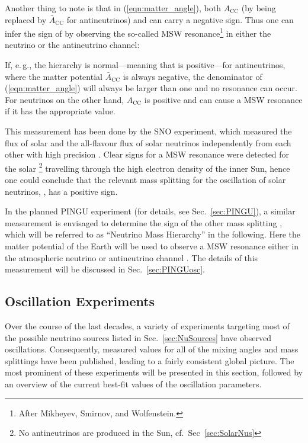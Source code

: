 Another thing to note is that in (\ref{eqn:matter_angle}), both $A_\mathrm{CC}$ 
(by being replaced by $\bar{A}_\mathrm{CC}$ for antineutrinos)
and \dm{} can carry a negative sign. Thus one can infer the sign of \dm{} by
observing the so-called MSW resonance\footnote{After Mikheyev, Smirnov, and
Wolfenstein.} in either the neutrino or the antineutrino channel:

If, e.\,g., the hierarchy is normal---meaning that \dm{} is positive---for 
antineutrinos, where the matter potential $\bar{A}_\mathrm{CC}$ is always 
negative, the denominator of (\ref{eqn:matter_angle}) will always be larger 
than one and no resonance can occur. For neutrinos on the other hand, 
$A_\mathrm{CC}$ is positive and can cause a MSW resonance if it has the 
appropriate value.

This measurement has been
done by the SNO experiment, which measured the flux of solar \nue and the
all-flavour flux of solar neutrinos independently from each other with high
precision \cite{SNOosc}. Clear signs for a MSW resonance were detected for the
solar \nue\footnote{No antineutrinos are produced in the Sun, cf.\
Sec~\ref{sec:SolarNus}} travelling through the high electron density of the
inner Sun, hence one could conclude that the relevant mass splitting for
the oscillation of solar neutrinos, \dm{21}, has a positive sign.

In the planned PINGU experiment (for details, see Sec.~\ref{sec:PINGU}), a
similar measurement is envisaged to determine the sign of the other mass
splitting \dm{31}, which will be referred to as ``Neutrino Mass Hierarchy'' in
the following. Here the matter potential of the Earth will be used to
observe a MSW resonance either in the atmospheric neutrino or antineutrino
channel \cite{Akhmedov, LoI}. The details of this measurement will be discussed
in Sec.~\ref{sec:PINGUosc}.




\subsection{Oscillation Experiments}
\label{sec:OscExp}

Over the course of the last decades, a variety of experiments targeting most of
the possible neutrino sources listed in Sec.~\ref{sec:NuSources} have observed
oscillations. Consequently, measured values for all of the mixing angles and
mass splittings have been published, leading to a fairly consistent global
picture. The most prominent of these experiments will be presented in this
section, followed by an overview of the current best-fit values of the
oscillation parameters.


